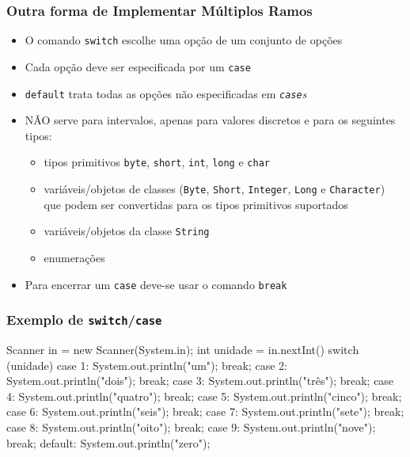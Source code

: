 \documentclass[xcolor={dvipsnames,table},aspectratio=169]{beamer}
\begin{document}
\begin{frame}\frametitle{Outra forma de Implementar Múltiplos Ramos}
\begin{itemize}
	\item O comando \texttt{switch} escolhe uma opção de um conjunto de opções
	\item Cada opção deve ser especificada por um \texttt{case}
	\item \texttt{default} trata todas as opções não especificadas em \emph{\texttt{case}s}
	\item NÃO serve para intervalos, apenas para valores discretos e para os seguintes tipos:
	\begin{itemize}
		\item tipos primitivos \texttt{byte}, \texttt{short}, \texttt{int}, \texttt{long} e \texttt{char}
		\item variáveis/objetos de classes (\texttt{Byte}, \texttt{Short}, \texttt{Integer}, \texttt{Long} e \texttt{Character}) que podem ser convertidas para os tipos primitivos suportados
		\item variáveis/objetos da classe \texttt{String}
		\item enumerações
	\end{itemize}
	\item Para encerrar um \texttt{case} deve-se usar o comando \texttt{break}
\end{itemize}
\end{frame}

\begin{frame}[fragile]\frametitle{Exemplo de \texttt{switch}/\texttt{case}}
{\small
\begin{javacode}
Scanner in = new Scanner(System.in);
int unidade = in.nextInt() %
switch (unidade) {
  case 1:  System.out.println("um");     break;
  case 2:  System.out.println("dois");   break;
  case 3:  System.out.println("três");   break;
  case 4:  System.out.println("quatro"); break;
  case 5:  System.out.println("cinco");  break;
  case 6:  System.out.println("seis");   break;
  case 7:  System.out.println("sete");   break;
  case 8:  System.out.println("oito");   break;
  case 9:  System.out.println("nove");   break;
  default: System.out.println("zero");
}
\end{javacode}
}
\end{frame}
\end{document}
